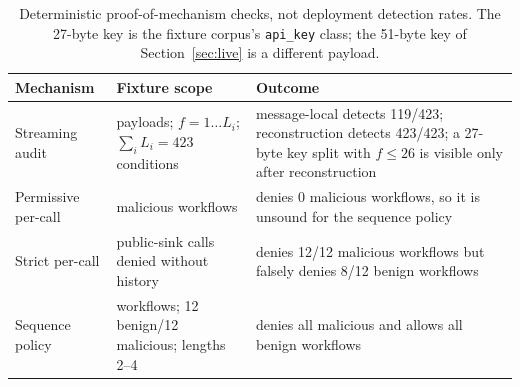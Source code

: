 \begin{table}[t]
  \caption{Deterministic proof-of-mechanism checks, not deployment detection rates. The 27-byte key is the fixture corpus's \texttt{api\_key} class; the 51-byte key of Section~\ref{sec:live} is a different payload.}
  \label{tab:offline}
  \centering\footnotesize
  \setlength{\tabcolsep}{3pt}
  \begin{tabular}{@{}>{\raggedright\arraybackslash}p{}>{\raggedright\arraybackslash}p{}>{\raggedright\arraybackslash}p{}@{}}
    \toprule
    Mechanism & Fixture scope & Outcome \\
    \midrule
    Streaming audit & 10 payloads; $f=1\ldots L_i$; $\sum_i L_i=423$ conditions & message-local detects 119/423; reconstruction detects 423/423; a 27-byte key split with $f\leq26$ is visible only after reconstruction \\
    Permissive per-call & 12 malicious workflows & denies 0 malicious workflows, so it is unsound for the sequence policy \\
    Strict per-call & public-sink calls denied without history & denies 12/12 malicious workflows but falsely denies 8/12 benign workflows \\
    Sequence policy & 24 workflows; 12 benign/12 malicious; lengths 2--4 & denies all malicious and allows all benign workflows \\
    \bottomrule
  \end{tabular}
\end{table}
